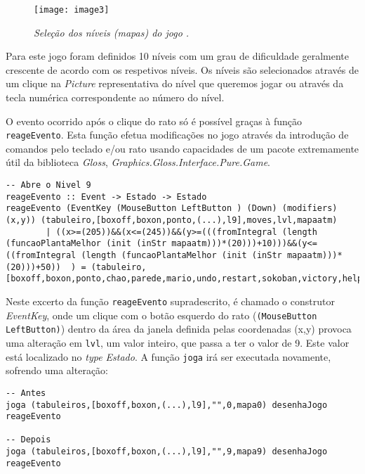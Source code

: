 \documentclass[a4paper,12pt]{report}
\begin{document}
\pagebreak

\begin{figure}[h]
	\centering
	\texttt{[image: image3]}
	\caption{\small\sl Seleção dos níveis (mapas) do jogo .}
	\captionsetup[figure]{list=yes}
\end{figure}
Para este jogo foram definidos 10 níveis com um grau de dificuldade geralmente crescente de acordo com os respetivos níveis. Os níveis são selecionados através de um clique na {\sl Picture} representativa do nível que queremos jogar ou através da tecla numérica correspondente ao número do nível.

O evento ocorrido após o clique do rato só é possível graças à função {\footnotesize\tt reageEvento}. Esta função efetua modificações no jogo através da introdução de comandos pelo teclado e/ou rato usando capacidades de um pacote extremamente útil da biblioteca {\sl Gloss}, {\it Graphics.Gloss.Interface.Pure.Game}.

\begin{lstlisting}[caption={\small\sl Excerto da função {\footnotesize\tt reageEvento}}]
-- Abre o Nivel 9
reageEvento :: Event -> Estado -> Estado
reageEvento (EventKey (MouseButton LeftButton ) (Down) (modifiers) (x,y)) (tabuleiro,[boxoff,boxon,ponto,(...),l9],moves,lvl,mapaatm)
		| ((x>=(205))&&(x<=(245))&&(y>=(((fromIntegral (length (funcaoPlantaMelhor (init (inStr mapaatm)))*(20)))+10)))&&(y<=((fromIntegral (length (funcaoPlantaMelhor (init (inStr mapaatm)))*(20)))+50))  ) = (tabuleiro,[boxoff,boxon,ponto,chao,parede,mario,undo,restart,sokoban,victory,help,l1,l2,l3,l4,l5,l6,l7,l8,l9,l0],moves,9,mapa0)
\end{lstlisting}

Neste excerto da função {\footnotesize\tt reageEvento} supradescrito, é chamado o construtor {\sl EventKey}, onde um clique com o botão esquerdo do rato ({\footnotesize\tt (MouseButton LeftButton)}) dentro da área da janela definida pelas coordenadas (x,y) provoca uma alteração em {\footnotesize\tt lvl}, um valor inteiro, que passa a ter o valor de 9. Este valor está localizado no {\sl type Estado}. A função {\footnotesize\tt joga} irá ser executada novamente, sofrendo uma alteração:
\begin{lstlisting}[caption={\small\sl A função {\footnotesize\tt joga}, que antes tinha o valor de 0, passa agora a ter o valor 9, fazendo com que apareça o mapa que escolhemos, o mapa9.}]
-- Antes
joga (tabuleiros,[boxoff,boxon,(...),l9],"",0,mapa0) desenhaJogo reageEvento

-- Depois
joga (tabuleiros,[boxoff,boxon,(...),l9],"",9,mapa9) desenhaJogo reageEvento
\end{lstlisting}
\end{document}
